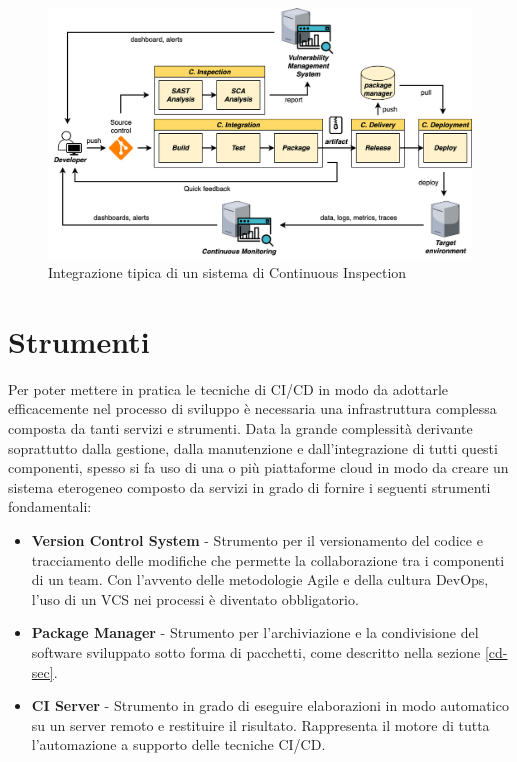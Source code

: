\begin{figure}[H]
    \centering
    \includegraphics[width=1\textwidth]{img/cinspection-pipeline.png}
    \caption{Integrazione tipica di un sistema di Continuous Inspection}
    \label{ci-inspection-pipeline}
\end{figure}

\section{Strumenti}
\label{devops-tools-sec}
Per poter mettere in pratica le tecniche di CI/CD in modo da adottarle efficacemente nel processo di sviluppo è necessaria una infrastruttura complessa composta da tanti servizi e strumenti. 
Data la grande complessità derivante soprattutto dalla gestione, 
dalla manutenzione e dall'integrazione di tutti questi componenti, 
spesso si fa uso di una o più piattaforme cloud in modo da creare un sistema eterogeneo composto da servizi in grado di fornire i seguenti strumenti fondamentali:

\begin{itemize}
    \item \textbf{Version Control System} - Strumento per il versionamento del codice e tracciamento delle modifiche che permette la collaborazione tra i componenti di un team. Con l'avvento delle metodologie Agile e della cultura DevOps, l'uso di un VCS nei processi è diventato obbligatorio.
    
    \item \textbf{Package Manager} - Strumento per l'archiviazione e la condivisione del software sviluppato sotto forma di pacchetti, come descritto nella sezione \ref{cd-sec}.
    
    \item \textbf{CI Server} - Strumento in grado di eseguire elaborazioni in modo automatico su un server remoto e restituire il risultato. Rappresenta il motore di tutta l'automazione a supporto delle tecniche CI/CD.
\end{itemize}


